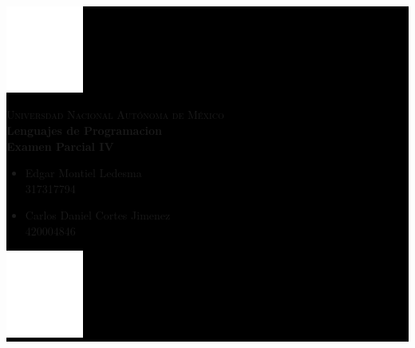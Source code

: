 \documentclass{article}
\begin{document}
\pagecolor{black}
\color{white}

    \colorbox{black}{
        \begin{minipage}[t]{0.16 \textwidth}
           \begin{flushright}
            \includegraphics[width=1in]{UNAM.png}
           \end{flushright}
        \end{minipage}
        \begin{minipage}[H]{0.62 \textwidth}
            \begin{center}
                {\large \textsc{Universdad Nacional Autónoma de México}}
                \vspace{0.25cm}
                \\
                { \large \textbf{Lenguajes de Programacion\\ Examen Parcial IV}}                
                \textbf{}
                \begin{multicols}{2}
                \begin{flushleft}
                \begin{itemize}
                    \item  \small Edgar Montiel Ledesma\\ 317317794
    
                    \item \footnotesize Carlos Daniel Cortes Jimenez\\ 420004846
                \end{itemize}
                \end{flushleft}
                \vspace{0.25cm}
                \end{multicols} 
            \end{center}
            \vspace{0.05cm}
        \end{minipage}
        \begin{minipage}[t]{0.16 \textwidth}
            \begin{flushleft}
                \includegraphics[width=1in]{EFC.png}
            \end{flushleft}
        \end{minipage}
    }
    
\end{document}
